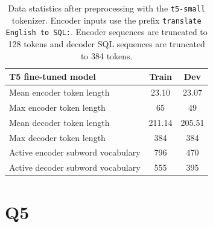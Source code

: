 \documentclass{article}
\begin{document}
\begin{table}[h!]
\centering
\begin{tabular}{lcc}
\toprule
\textbf{T5 fine-tuned model} & Train & Dev \\
\midrule
Mean encoder token length & 23.10 & 23.07 \\
Max encoder token length & 65 & 49 \\
Mean decoder token length & 211.14 & 205.51 \\
Max decoder token length & 384 & 384 \\
Active encoder subword vocabulary & 796 & 470 \\
Active decoder subword vocabulary & 555 & 395 \\
\bottomrule
\end{tabular}
\caption{Data statistics after preprocessing with the \texttt{t5-small} tokenizer. Encoder inputs use the prefix \texttt{translate English to SQL:}. Encoder sequences are truncated to 128 tokens and decoder SQL sequences are truncated to 384 tokens.}
\label{tab:data_stats_after}
\end{table}

\newpage

\section*{Q5}\label{sec:t5}
\end{document}
